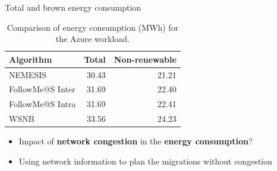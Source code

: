 \documentclass[Ligatures=TeX,table,svgnames,usetotalslideindicator,compress,10pt,aspectratio=169]{beamer}
\begin{document}
\begin{frame}{Total and brown energy consumption}  
  \begin{table}[!h]
    \caption{Comparison of energy consumption (MWh) for the Azure workload.}\label{tab:total_energy_cons} \centering
    \begin{tabular}{|l|r|r|}      
      \hline
      \textbf{Algorithm} & \textbf{Total} &  \textbf{Non-renewable} \\
      \hline
      NEMESIS  & 30.43 & 21.21 \\
      \hline
      FollowMe@S Inter & 31.69 & 22.40 \\
      \hline
      FollowMe@S Intra & 31.69 & 22.41 \\      
      \hline
      WSNB & 33.56 & 24.23 \\
      \hline
    \end{tabular}
  \end{table}  
  \pause

\begin{itemize}
    \item Impact of \textbf{network congestion} in the \textbf{energy consumption}?
    \item Using network information to plan the migrations without congestion
\end{itemize}
\end{frame}
\end{document}
